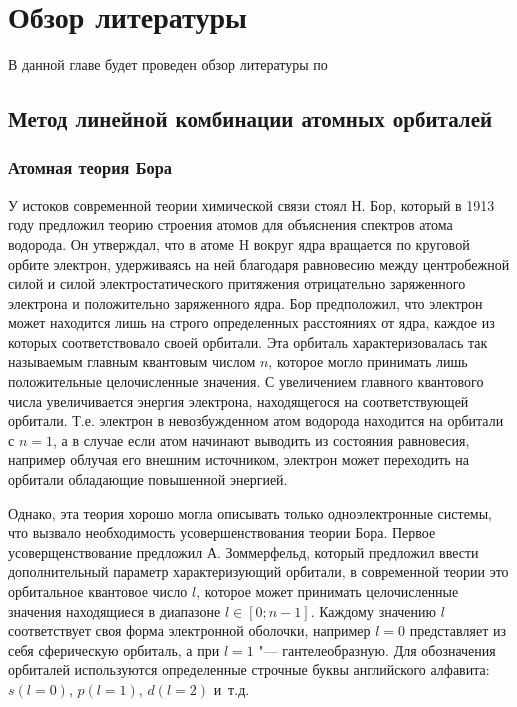 \chapter{Обзор литературы} \label{chapt1}

В данной главе будет проведен обзор литературы по 

\section{Метод линейной комбинации атомных орбиталей} \label{sect1_1}

\subsection{Атомная теория Бора}

У истоков современной теории химической связи стоял Н. Бор, который в 1913 году предложил теорию строения атомов для объяснения спектров атома водорода. 
Он утверждал, что в атоме H вокруг ядра вращается по круговой орбите электрон, удерживаясь на ней благодаря равновесию между центробежной силой и силой электростатического притяжения отрицательно заряженного электрона и положительно заряженного ядра.
Бор предположил, что электрон может находится лишь на строго определенных расстояниях от ядра, каждое из которых соответствовало своей орбитали.
Эта орбиталь характеризовалась так называемым главным квантовым числом $n$, которое могло принимать лишь положительные целочисленные значения.
С увеличением главного квантового числа увеличивается энергия электрона, находящегося на соответствующей орбитали. 
Т.е. электрон в невозбужденном атом водорода находится на орбитали с $n=1$, а в случае если атом начинают выводить из состояния равновесия, например облучая его внешним источником, электрон может переходить на орбитали обладающие повышенной энергией.

Однако, эта теория хорошо могла описывать только одноэлектронные системы, что вызвало необходимость усовершенствования теории Бора.
Первое усоверщенствование предложил А. Зоммерфельд, который предложил ввести дополнительный параметр характеризующий орбитали, в современной теории это орбитальное квантовое число $l$, которое может принимать целочисленные значения находящиеся в диапазоне $l \in [0;n-1]$. 
Каждому значению $l$ соответствует своя форма электронной оболочки, например $l=0$ представляет из себя сферическую орбиталь, а при $l=1$ "--- гантелеобразную. 
Для обозначения орбиталей используются определенные строчные буквы английского алфавита: $s(l=0)$, $p(l=1)$, $d(l=2)$ и~т.д.

